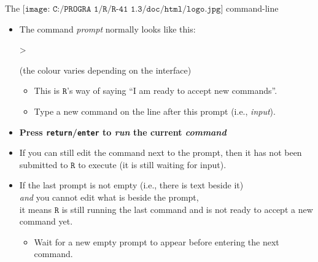 \documentclass[
  ignorenonframetext,
]{beamer}
\newenvironment{Shaded}{\begin{snugshade}}{\end{snugshade}}
\newcommand{\AlertTok}[1]{\textcolor[rgb]{0.94,0.16,0.16}{#1}}
\newcommand{\NormalTok}[1]{#1}
\providecommand{\tightlist}{%
  \setlength{\itemsep}{0pt}\setlength{\parskip}{0pt}}
\begin{document}
\begin{frame}[fragile]{The
\(\texttt{[image: C:/PROGRA~1/R/R-41~1.3/doc/html/logo.jpg]}\)
command-line}
\protect\hypertarget{the-includegraphicsheight1emcprogra1rr-411.3dochtmllogo.jpg-command-line}{}
\begin{itemize}
\item
  The command \emph{prompt} normally looks like this:

\begin{Shaded}
\begin{Highlighting}[]
\NormalTok{\textgreater{}}
\end{Highlighting}
\end{Shaded}

  {\footnotesize (the colour varies depending on the interface)}

  \begin{itemize}
  \tightlist
  \item
    This is \(\texttt{R}\)'s way of saying ``I am ready to accept new
    commands''.
  \item
    Type a new command on the line after this prompt (i.e.,
    \emph{input}).
  \end{itemize}
\item
  \textbf{Press \AlertTok{\texttt{return}}/\AlertTok{\texttt{enter}} to
  \emph{run} the current \emph{command} }
\item
  If you can still edit the command next to the prompt, then it has not
  been submitted to \(\texttt{R}\) to execute (it is still waiting for
  input).
\item
  If the last prompt is not empty (i.e., there is text beside it)\\
  \emph{and} you cannot edit what is beside the prompt,\\
  it means \(\texttt{R}\) is still running the last command and is not
  ready to accept a new command yet.

  \begin{itemize}
  \tightlist
  \item
    Wait for a new empty prompt to appear before entering the next
    command.
  \end{itemize}
\end{itemize}
\end{frame}
\end{document}

